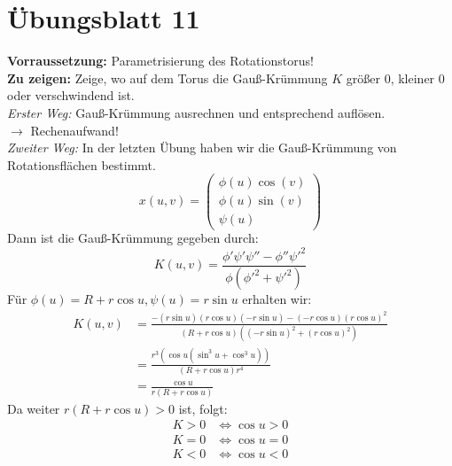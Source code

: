 %
\section{Übungsblatt 11}

\begin{problem*}[1]
  \textbf{Vorraussetzung:} Parametrisierung des Rotationstorus! \\
  \textbf{Zu zeigen:} Zeige, wo auf dem Torus die Gauß-Krümmung \( K \) größer 0, kleiner 0 oder verschwindend ist. \\
  \emph{Erster Weg:} Gauß-Krümmung ausrechnen und entsprechend auflösen. \\
  \( \rightarrow \) Rechenaufwand! \\
  \emph{Zweiter Weg:} In der letzten Übung haben wir die Gauß-Krümmung von Rotationsflächen bestimmt.
  \begin{equation*}
    x(u,v) = \begin{pmatrix}
      \phi(u) \cos(v) \\
      \phi(u) \sin(v) \\
      \psi(u)	
    \end{pmatrix}
  \end{equation*}
  Dann ist die Gauß-Krümmung gegeben durch: 
  \begin{equation*}	
    K(u,v) = \frac{\phi' \psi' \psi'' - \phi'' \psi'^2}{\phi(\phi'^2 + \psi'^2)}
  \end{equation*}
  Für \( \phi(u) = R + r \cos u, \psi(u) = r \sin u \) erhalten wir:
  \begin{align*}
    K(u,v) &= \frac{-(r \sin u)(r \cos u)(-r \sin u)-(-r \cos u){(r \cos u)}^2}{(R+r \cos u)({(-r \sin u)}^2 + {(r \cos u)}^2)} \\
    &= \frac{r^3(\cos u(\sin^3u + \cos^3 u))}{ (R + r \cos u) r^4} \\
    &= \frac{\cos u}{r(R+r \cos u)} 
  \end{align*}
  Da weiter \( r(R + r \cos u) > 0 \) ist, folgt: 
  \begin{align*}
    K > 0 &\Leftrightarrow \cos u > 0 \\
    K = 0 &\Leftrightarrow \cos u = 0 \\
    K < 0 &\Leftrightarrow \cos u < 0
  \end{align*}


\end{problem*}
